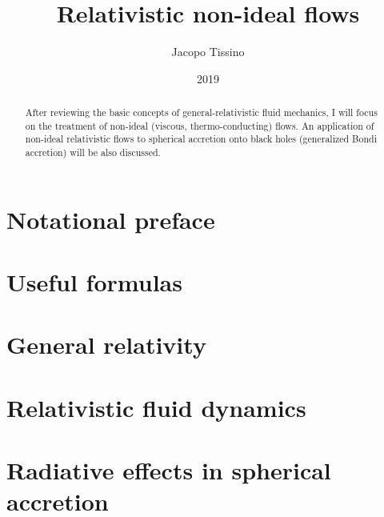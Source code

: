 \documentclass[a4paper, 11pt]{article}
\title{Relativistic non-ideal flows}
\author{Jacopo Tissino}
\date{2019}
\begin{document}


\begin{abstract}
After reviewing the basic concepts of general-relativistic fluid mechanics, I will focus on the treatment of non-ideal
(viscous, thermo-conducting) flows. An application of non-ideal relativistic flows to spherical accretion onto black holes
(generalized Bondi accretion) will be also discussed.
\end{abstract}

\section{Notational preface} \label{sec:notational-preface}


\section{Useful formulas}


\section{General relativity} \label{sec:general-relativity}


\section{Relativistic fluid dynamics} \label{sec:fluid-dynamics}


\section{Radiative effects in spherical accretion} \label{sec:radiative-effects}


\printbibliography[title={Bibliography}]

\end{document}
